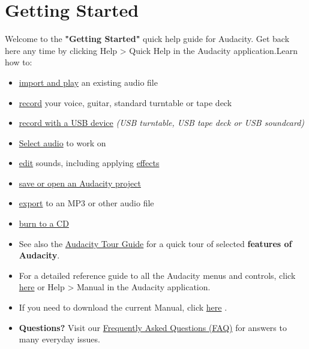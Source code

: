 \label{quick_help_}
\chapter{Getting Started}\begin{multicols}{2}Welcome to the \textbf{"Getting Started"} quick help guide for Audacity. Get back here any time by clicking Help > Quick Help in the Audacity application.Learn how to:

\begin{itemize}
\item 
\hyperref[\foo{man_play_}]{ import and play}
 an existing audio file 
\item 
\hyperref[\foo{man_record_}]{ record}
 your voice, guitar, standard turntable or tape deck
\item 
\hyperref[\foo{man_usb_recording_}]{ record with a USB device}
\textit{(USB turntable, USB tape deck or USB soundcard)}
\item 
\hyperref[\foo{man_selecting_audio_the_basics_}]{Select audio}
 to work on
\item 
\hyperref[\foo{man_edit_}]{ edit}
 sounds, including applying 
\hyperref[\foo{man_effect_menu_}]{effects}

\item 
\hyperref[\foo{man_saving_}]{ save or open an Audacity project}

\item 
\hyperref[\foo{man_export_}]{ export}
 to an MP3 or other audio file
\item 
\hyperref[\foo{man_burncd_}]{ burn to a CD}

\end{itemize}

\begin{itemize}
\item  See also the 
\hyperref[\foo{man_audacity_tour_guide_}]{Audacity Tour Guide}
 for a quick tour of selected \textbf{features of Audacity}. 
\item  For a detailed reference guide to all the Audacity menus and controls, click 
\hyperref[\foo{index_reference}]{here}
 or Help > Manual in the Audacity application. 
\item  If you need to download the current Manual, click 
\hyperref[\foo{man_unzipping_the_manual_}]{here}
.
\item \textbf{Questions?} Visit our 
\hyperref[\foo{man_faq_}]{Frequently Asked Questions (FAQ)}
 for answers to many everyday issues.  
\end{itemize}
\end{multicols}